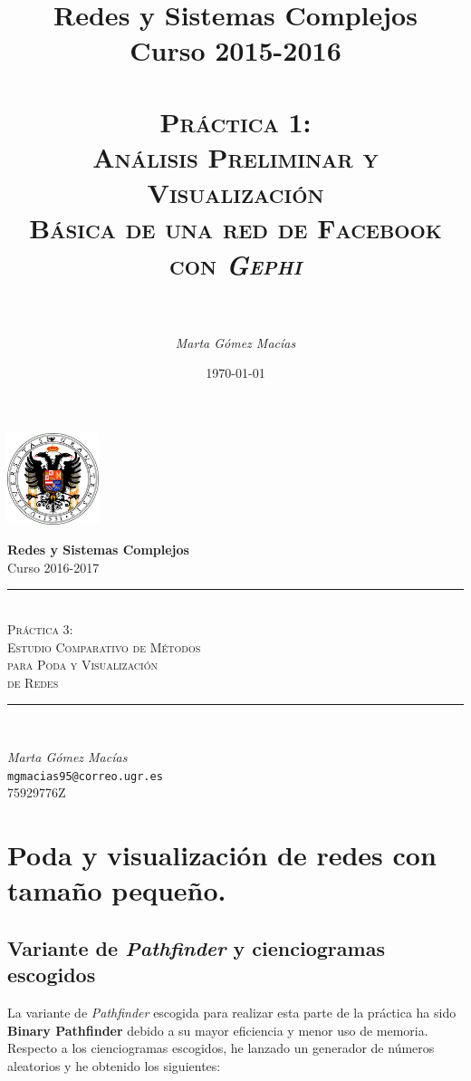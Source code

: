 \documentclass[10pt,a4paper,spanish]{article}
\title{
\normalfont \normalsize 
{\bf Redes y Sistemas Complejos} \\ Curso 2015-2016 \\ [25pt] %
\horrule{0.5pt} \\[0.4cm] %
\huge \textsc{Práctica 1: \\ Análisis Preliminar y Visualización \\ Básica de una red de Facebook \\ con \textit{Gephi}} \\ %
\horrule{2pt} \\[0.5cm] %
}
\author{\textit{Marta Gómez Macías}} %
\numberwithin{equation}{section} %
\numberwithin{figure}{section} %
\numberwithin{table}{section} %
\newcommand{\horrule}[1]{\rule{\linewidth}{#1}} %
\begin{document}
\renewcommand{\listtablename}{Índice de tablas}
\renewcommand{\tablename}{Tabla} 

\begin{titlepage}
\begin{center}
\includegraphics[width=0.2\textwidth]{../../ugr}

\normalfont \normalsize 
{\bf Redes y Sistemas Complejos} \\ Curso 2016-2017 \\ [25pt] %
\horrule{0.5pt} \\[0.4cm] %
{\huge \textsc{Práctica 3: \\ Estudio Comparativo de Métodos \\ para Poda y Visualización \\ de Redes }} %
\horrule{2pt} \\[0.5cm] %

{\Large \textit{Marta Gómez Macías} \\ \texttt{mgmacias95@correo.ugr.es} \\ 75929776Z \\[0.5cm]

\date{\today}} %
\end{center}
\end{titlepage}

\tableofcontents %



\section{Poda y visualización de redes con tamaño pequeño.}


\subsection{Variante de \textit{Pathfinder} y cienciogramas escogidos}
La variante de \textit{Pathfinder} escogida para realizar esta parte de la práctica ha sido \textbf{Binary Pathfinder} debido a su mayor eficiencia y menor uso de memoria. Respecto a los cienciogramas escogidos, he lanzado un generador de números aleatorios y he obtenido los siguientes:
\end{document}

